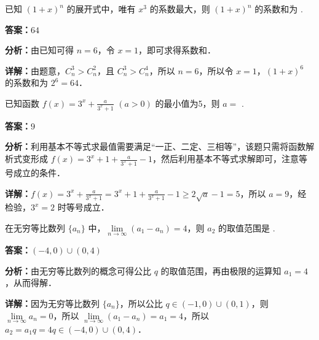 \begin{question}[points=5]
已知 $(1+x)^n$ 的展开式中，唯有 $x^3$ 的系数最大，则 $(1+x)^n$ 的系数和为  .
\fillin[{$64$}]
\begin{solution}
\textbf{答案：}$64$

\textbf{分析：}由已知可得 $n=6$，令 $x=1$，即可求得系数和．

\textbf{详解：}由题意，$C_n^3>C_n^2$，且 $C_n^3>C_n^4$，所以 $n=6$，所以令 $x=1$，$(1+x)^6$ 的系数和为 $2^6=64$．
\end{solution}
\end{question}

\begin{question}[points=5]
已知函数 $f(x)=3^x+\frac{a}{3^x+1}$ $(a>0)$ 的最小值为5，则 $a=$  .
\fillin[{$9$}]
\begin{solution}
\textbf{答案：}$9$

\textbf{分析：}利用基本不等式求最值需要满足“一正、二定、三相等”，该题只需将函数解析式变形成 $f(x)=3^x+1+\frac{a}{3^x+1}-1$，然后利用基本不等式求解即可，注意等号成立的条件．

\textbf{详解：}$f(x)=3^x+\frac{a}{3^x+1}=3^x+1+\frac{a}{3^x+1}-1\geq 2\sqrt{a}-1=5$，所以 $a=9$，经检验，$3^x=2$ 时等号成立．
\end{solution}
\end{question}

\begin{question}[points=5]
在无穷等比数列 $\{a_n\}$ 中，$\lim\limits_{n\to\infty}(a_1-a_n)=4$，则 $a_2$ 的取值范围是  .
\fillin[{$(-4,0)\cup(0,4)$}]
\begin{solution}
\textbf{答案：}$(-4,0)\cup(0,4)$

\textbf{分析：}由无穷等比数列的概念可得公比 $q$ 的取值范围，再由极限的运算知 $a_1=4$，从而得解．

\textbf{详解：}因为无穷等比数列 $\{a_n\}$，所以公比 $q\in(-1,0)\cup(0,1)$，则 $\lim\limits_{n\to\infty}a_n=0$，所以 $\lim\limits_{n\to\infty}(a_1-a_n)=a_1=4$，所以 $a_2=a_1q=4q\in(-4,0)\cup(0,4)$．
\end{solution}
\end{question}

